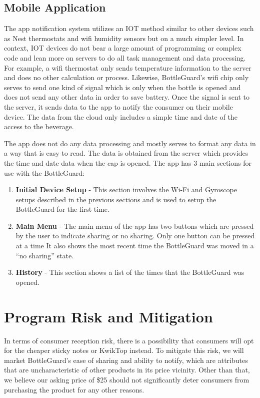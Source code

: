 \documentclass[12pt]{article}
\begin{document}
	\subsection*{Mobile Application}
	The app notification system utilizes an IOT method similar to other devices such as Nest thermostats and wifi humidity sensors but on a much simpler level. In context, IOT devices do not bear a large amount of programming or complex code and lean more on servers to do all task management and data processing. For example, a wifi thermostat only sends temperature information to the server and does no other calculation or process. Likewise, BottleGuard’s wifi chip only serves to send one kind of signal which is only when the bottle is opened and does not send any other data in order to save battery. Once the signal is sent to the server, it sends data to the app to notify the consumer on their mobile device. The data from the cloud only includes a simple time and date of the access to the beverage. 
	
	The app does not do any data processing and mostly serves to format any data in a way that is easy to read. The data is obtained from the server which provides the time and date data when the cap is opened. The app has 3 main sections for use with the BottleGuard:
	
	\begin{enumerate}
		\item \textbf{Initial Device Setup} - This section involves the Wi-Fi and Gyroscope setups described in the previous sections and is used to setup the BottleGuard for the first time.
		\item \textbf{Main Menu} - The main menu of the app has two buttons which are pressed by the user to indicate sharing or no sharing. Only one button can be pressed at a time It also shows the most recent time the BottleGuard was moved in a “no sharing” state. 
		\item \textbf{History} - This section shows a list of the times that the BottleGuard was opened.
	\end{enumerate}
	
	\section*{Program Risk and Mitigation}
	In terms of consumer reception risk, there is a possibility that consumers will opt for the cheaper sticky notes or KwikTop instead. To mitigate this risk, we will market BottleGuard’s ease of sharing and ability to notify, which are attributes that are uncharacteristic of other products in its price vicinity. Other than that, we believe our asking price of \$25 should not significantly deter consumers from purchasing the product for any other reasons.
	
\end{document}
